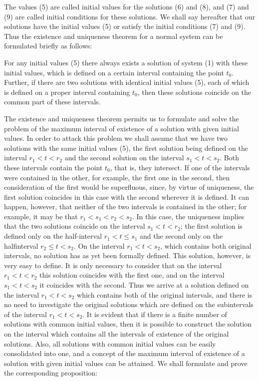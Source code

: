 \documentclass[10pt,a5paper]{book}
\theoremstyle{plain}
\theoremstyle{definition}
\theoremstyle{remark}
\begin{document}
The values (5) are called initial values for the solutions (6) and (8), and (7) and (9) are called initial conditions for these solutions. We shall say hereafter that our solutions have the initial values (5) or satisfy the initial conditions (7) and (9). Thus the existence and uniqueness theorem for a normal system can be formulated briefly as follows:

For any initial values (5) there always exists a solution of system (1) with these initial values, which is defined on a certain interval containing the point $t_{0}$. Further, if there are two solutions with identical initial values (5), each of which is defined on a proper interval containing $t_{0}$, then these solutions coincide on the common part of these intervals.

The existence and uniqueness theorem permits us to formulate and solve the problem of the maximum interval of existence of a solution with given initial values. In order to attack this problem we shall assume that we have two solutions with the same initial values (5), the first solution being defined on the interval $r_{1}<t<r_{2}$ and the second solution on the interval
$s_{1}<t<s_{2}$. Both these intervals contain the point $t_{0}$, that is, they intersect. If one of the intervals were contained in the other, for example, the first one in the second, then consideration of the first would be superfluous, since, by virtue of uniqueness, the first solution coincides in this case with the second wherever it is defined. It can happen, however, that neither of the two intervals is contained in the other; for example, it may be that $r_{1}<s_{1}<r_{2}<s_{2}$. In this case, the uniqueness implies that the two solutions coincide on the interval $s_{1}<t<r_{2}$; the first solution is defined only on the half-interval $r_{1}<t \leq s_{1}$ and the second only on the halfinterval $r_{2} \leq t<s_{2}$. On the interval $r_{1}<t<s_{2}$, which contains both original intervals, no solution has as yet been formally defined. This solution, however, is very easy to define. It is only necessary to consider that on the interval $r_{1}<t<r_{2}$ this solution coincides with the first one, and on the interval $s_{1}<t<s_{2}$ it coincides with the second. Thus we arrive at a solution defined on the interval $r_{1}<t<s_{2}$ which contains both of the original intervals, and there is no need to investigate the original solutions which are defined on the subintervals of the interval $r_{1}<t<s_{2}$. It is evident that if there is a finite number of solutions with common initial values, then it is possible to construct the solution on the interval which contains all the intervals of existence of the original solutions. Also, all solutions with common initial values can be easily consolidated into one, and a concept of the maximum interval of existence of a solution with given initial values can be attained. We shall formulate and prove the corresponding proposition:
\end{document}
